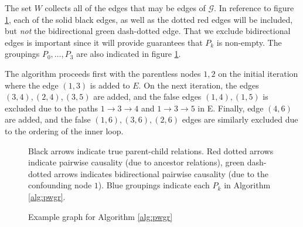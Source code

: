 \documentclass[12pt]{article}
\def\gcg{\mathcal{G}}  %
\begin{document}
\begin{example}
  The set $W$ collects all of the edges that may be edges of $\gcg$.
  In reference to figure \ref{fig:example_fig3}, each of the solid
  black edges, as well as the dotted red edges will be included, but
  \textit{not} the bidirectional green dash-dotted edge.  That we exclude
  bidirectional edges is important since it will provide guarantees
  that $P_k$ is non-empty.  The groupings $P_0, \ldots, P_3$
  are also indicated in figure \ref{fig:example_fig3}.

  The algorithm proceeds first with the parentless nodes $1, 2$ on the
  initial iteration where the edge $(1, 3)$ is added to $E$.  On the
  next iteration, the edges $(3, 4), (2, 4), (3, 5)$ are added, and
  the false edges $(1, 4), (1, 5)$ is excluded due to the paths
  $1 \rightarrow 3 \rightarrow 4$ and $1 \rightarrow 3 \rightarrow 5$
  in E.  Finally, edge $(4, 6)$ are added, and the false
  $(1, 6), (3, 6), (2, 6)$ edges are similarly excluded due to the
  ordering of the inner loop.
  
  \begin{figure}
    \centering
    \caption{Example graph for Algorithm \ref{alg:pwgr}}
    \footnotesize{Black arrows indicate true parent-child
      relations.  Red dotted arrows indicate pairwise causality (due to
      ancestor relations), green dash-dotted arrows indicates
      bidirectional pairwise causality (due to the confounding node
      $1$).  Blue groupings indicate each $P_k$ in Algorithm
      \ref{alg:pwgr}.}
    \label{fig:example_fig3}
    

\end{figure}
\end{example}
\end{document}
